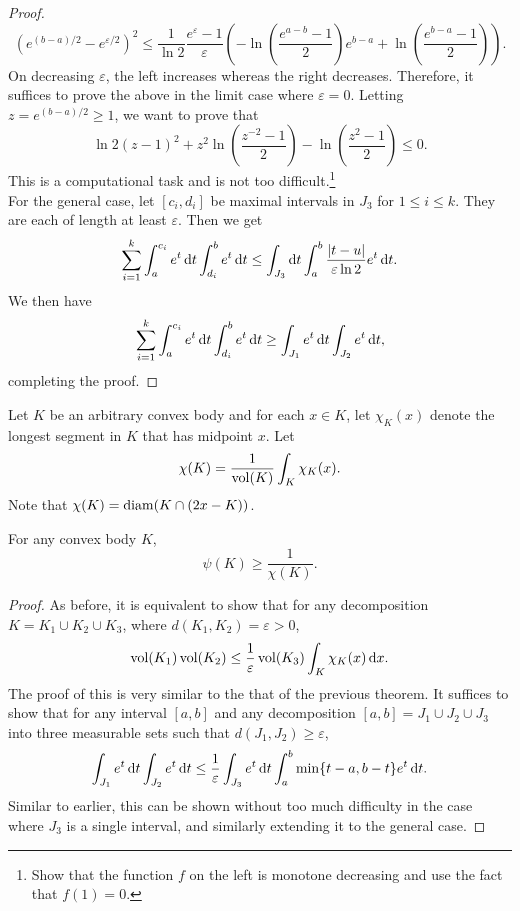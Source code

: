 \begin{proof}
			\[ (e^{(b-a)/2} - e^{\varepsilon/2})^2 \leq \frac{1}{\ln 2} \frac{e^\varepsilon-1}{\varepsilon} \left(-\ln\left(\frac{e^{a-b}-1}{2}\right)e^{b-a} + \ln\left(\frac{e^{b-a}-1}{2}\right)\right). \]
			On decreasing $\varepsilon$, the left increases whereas the right decreases. Therefore, it suffices to prove the above in the limit case where $\varepsilon=0$. Letting $z=e^{(b-a)/2}\geq 1$, we want to prove that
			\[ \ln 2 (z - 1)^2 + z^2\ln\left(\frac{z^{-2}-1}{2}\right) - \ln\left(\frac{z^2-1}{2}\right) \leq 0. \]
			This is a computational task and is not too difficult.\footnote{Show that the function $f$ on the left is monotone decreasing and use the fact that $f(1)=0$.}\\

			For the general case, let $[c_i,d_i]$ be maximal intervals in $J_3$ for $1\leq i\leq k$. They are each of length at least $\varepsilon$. Then we get
			\[ \sum_{i=1}^k \int_a^{c_i} e^t\operatorname{d}\!{t} \int_{d_i}^b e^t\operatorname{d}\!{t} \leq \int_{J_3}\operatorname{d}\!{t} \int_a^b \frac{|t-u|}{\varepsilon\ln 2}e^t\operatorname{d}\!{t}. \]
			We then have
			\[ \sum_{i=1}^k \int_a^{c_i} e^t\operatorname{d}\!{t} \int_{d_i}^b e^t\operatorname{d}\!{t} \geq \int_{J_1} e^t\operatorname{d}\!{t} \int_{J_2} e^t\operatorname{d}\!{t}, \]
			completing the proof.
		\end{proof}


		Let $K$ be an arbitrary convex body and for each $x\in K$, let $\chi_K(x)$ denote the longest segment in $K$ that has midpoint $x$. Let
		\[ \chi(K) = \frac{1}{\operatorname{vol}(K)} \int_K \chi_K(x). \]
		Note that $\chi(K)=\operatorname{diam}(K \cap (2x-K))$.

		\begin{ftheo}
			\label{isoperimetric coefficient bound 2}
			For any convex body $K$,
			\[ \psi(K) \geq \frac{1}{\chi(K)}. \]
		\end{ftheo}
		\begin{proof}
			As before, it is equivalent to show that for any decomposition $K=K_1\cup K_2\cup K_3$, where $d(K_1,K_2)=\varepsilon>0$,
			\[ \operatorname{vol}(K_1)\operatorname{vol}(K_2) \leq \frac{1}{\varepsilon}\operatorname{vol}(K_3) \int_K \chi_K(x)\operatorname{d}\!{x}. \]
			The proof of this is very similar to the that of the previous theorem. It suffices to show that for any interval $[a,b]$ and any decomposition $[a,b]=J_1\cup J_2\cup J_3$ into three measurable sets such that $d(J_1,J_2)\geq \varepsilon$,
			\[ \int_{J_1} e^t\operatorname{d}\!{t} \int_{J_2} e^t\operatorname{d}\!{t} \leq \frac{1}{\varepsilon} \int_{J_3} e^t\operatorname{d}\!{t} \int_a^b \min\{t-a, b-t\}e^t\operatorname{d}\!{t}. \]
			Similar to earlier, this can be shown without too much difficulty in the case where $J_3$ is a single interval, and similarly extending it to the general case.
		\end{proof}

